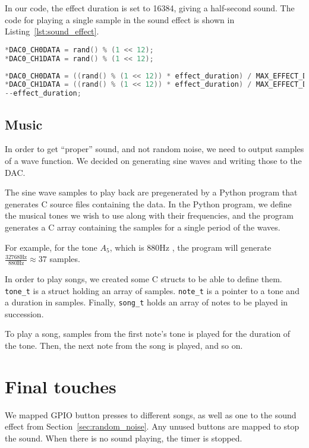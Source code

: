 In our code, the effect duration is set to 16384, giving a half-second sound. The code for playing a single sample in the sound effect is shown in Listing~\ref{lst:sound_effect}.

\begin{lstlisting}[language=c, label=lst:dac_random, caption=Writing random data to DAC0 channels 1 and 2.]
*DAC0_CH0DATA = rand() % (1 << 12);
*DAC0_CH1DATA = rand() % (1 << 12);
\end{lstlisting}

\begin{lstlisting}[language=c, label=lst:sound_effect, caption=Playing a sound effect.]
*DAC0_CH0DATA = ((rand() % (1 << 12)) * effect_duration) / MAX_EFFECT_DURATION;
*DAC0_CH1DATA = ((rand() % (1 << 12)) * effect_duration) / MAX_EFFECT_DURATION;
--effect_duration;
\end{lstlisting}

\subsection{Music}
In order to get ``proper'' sound, and not random noise, we need to output samples of a wave function. We decided on generating sine waves and writing those to the DAC.

The sine wave samples to play back are pregenerated by a Python program that generates C source files containing the data. In the Python program, we define the musical tones we wish to use along with their frequencies, and the program generates a C array containing the samples for a single period of the waves.

For example, for the tone $A_5$, which is 880Hz \cite{notefreqs}, the program will generate $\frac{32768\mathrm{Hz}}{880\mathrm{Hz}} \approx 37$ samples.

In order to play songs, we created some C structs to be able to define them. \texttt{tone\_t} is a struct holding an array of samples. \texttt{note\_t} is a pointer to a tone and a duration in samples. Finally, \texttt{song\_t} holds an array of notes to be played in succession.

To play a song, samples from the first note's tone is played for the duration of the tone. Then, the next note from the song is played, and so on. 

\section{Final touches}
We mapped GPIO button presses to different songs, as well as one to the sound effect from Section~\ref{sec:random_noise}. Any unused buttons are mapped to stop the sound. When there is no sound playing, the timer is stopped.


